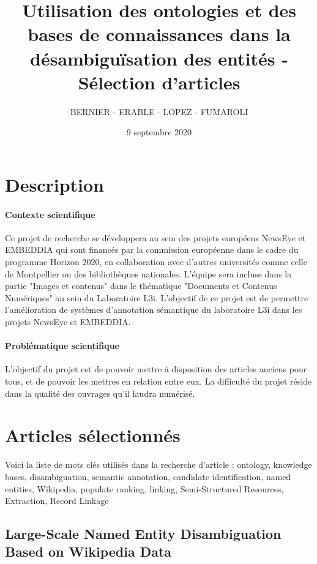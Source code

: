 \documentclass{article}
\begin{document}
\title{Utilisation des ontologies et des bases de connaissances dans la désambiguïsation des entités - Sélection d'articles}
\author{BERNIER - ERABLE - LOPEZ - FUMAROLI}
\date{9 septembre 2020}
\maketitle

\tableofcontents

\section{Description}

\paragraph{Contexte scientifique}

Ce projet de recherche se développera au sein des projets européens NewsEye et EMBEDDIA qui sont financés par la commission européenne dans le cadre du programme Horizon 2020, en collaboration avec d’autres universités comme celle de Montpellier ou des bibliothèques nationales. L’équipe sera incluse dans la partie "Images et contenus" dans le thématique "Documents et Contenus Numériques" au sein du Laboratoire L3i. L’objectif de ce projet est de permettre l’amélioration de systèmes d’annotation sémantique du laboratoire L3i dans les projets NewsEye et EMBEDDIA. 

\paragraph{Problématique scientifique}
L’objectif du projet est de pouvoir mettre à disposition des articles anciens pour tous, et de pouvoir les mettres en relation entre eux. La difficulté du projet réside dans la qualité des ouvrages qu’il faudra numérisé.


\section{Articles sélectionnés}
Voici la liste de mots clés utilisés dans la recherche d'article : ontology, knowledge bases, disambiguation, semantic annotation, candidate identification, named entities, Wikipedia, populate ranking, linking, Semi-Structured Resources, Extraction, Record Linkage

\subsection{Large-Scale Named Entity Disambiguation Based on Wikipedia Data\cite{article-1}}
\end{document}
